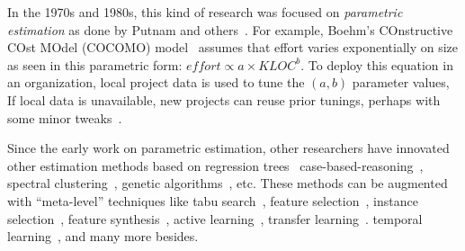 \documentclass{sig-alternate}
\begin{document}
In the 1970s and 1980s, this kind of research was focused on
{\em parametric estimation} as done 
by Putnam and
others~\cite{wol74,frei79,black77,herd77,watson77,boehm81}. For example, Boehm's
COnstructive COst MOdel (COCOMO)
model~\cite{boehm81} 
 assumes  that effort varies exponentially on size as seen in this parametric form:
$\mathit{effort} \propto \mathit{a \times KLOC}^b$. To deploy this equation in an organization,
local project data is used to tune the  $(a,b)$ parameter values, If local
data is unavailable, new projects can reuse prior tunings, perhaps with some minor
tweaks~\cite{me04h}. 



Since the early work on parametric estimation, other researchers
have innovated other estimation methods based on
regression
trees~\cite{shepperd97}
case-based-reasoning~\cite{shepperd97}, spectral
clustering~\cite{me12d}, genetic
algorithms~\cite{cordero97,burgess01}, etc.  These methods
can be augmented with  ``meta-level'' techniques like tabu search~\cite{cora10}, feature selection~\cite{chen05}, instance selection~\cite{koc11b},
feature synthesis~\cite{me12a}, active learning~\cite{me13a}, transfer learning~\cite{kocaguneli2014transfer}.
temporal learning~\cite{lokan09,minku14}, and many more besides.


\end{document}
